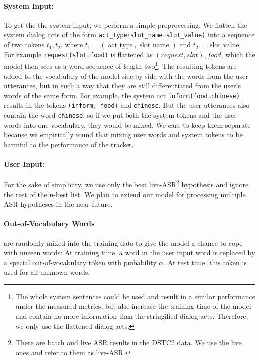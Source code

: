 \documentclass[10pt,twocolumn]{article}
\begin{document}
\paragraph*{System Input:}
To get the the system input, we perform a simple preprocessing. We flatten the system dialog acts of the form \texttt{act\_type(slot\_name=slot\_value)} into a sequence of two tokens $t_1, t_2$, where $t_1=(\operatorname{act\_type}, \operatorname{slot\_name})$ and $t_2=\operatorname{slot\_value}$. For example \texttt{request(slot=food)} is flattened as $(request, slot), food$, which the model then sees as a word sequence of length two\footnote{The whole system sentences could be used and result in a similar performance under the measured metrics, but also increase the training time of the model and contain no more information than the stringified dialog acts. Therefore, we only use the flattened dialog acts.}. The resulting tokens are added to the vocabulary of the model side by side with the words from the user utterances, but in such a way that they are still differentiated from the user's words of the same form. For example, the system act \texttt{inform(food=chinese)} results in the tokens \texttt{(inform, food)} and \texttt{chinese}. But the user utterances also contain the word \texttt{chinese}, so if we put both the system tokens and the user words into one vocabulary, they would be mixed. We care to keep them separate because we empirically found that mixing user words and system tokens to be harmful to the performance of the tracker.

\paragraph*{User Input:}
For the sake of simplicity, we use only the best live-ASR\footnote{There are batch and live ASR results in the DSTC2 data. We use the live ones and refer to them as live-ASR.} hypothesis and ignore the rest of the n-best list.
We plan to extend our model for processing multiple ASR hypotheses in the near future.

\paragraph*{Out-of-Vocabulary Words}
are randomly mixed into the training data to give the model a chance to cope with unseen words: At training time, a word in the user input word is replaced by a special out-of-vocabulary token with probability $\alpha$. At test time, this token is used for all unknown words.
\end{document}
